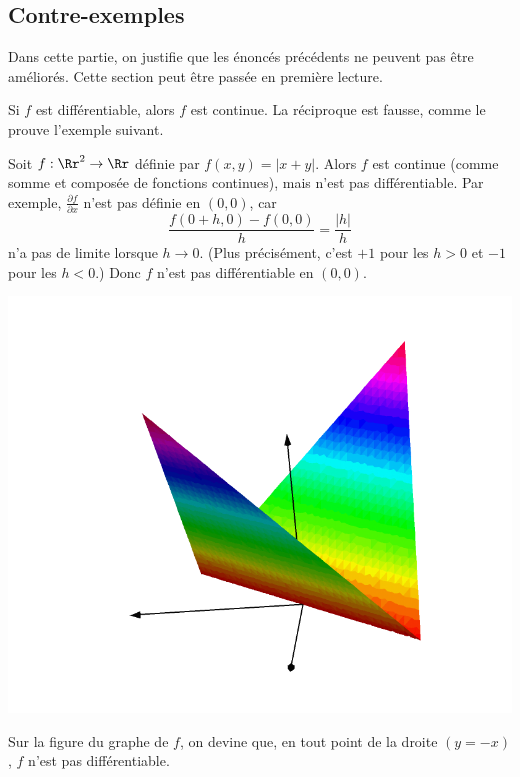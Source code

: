\documentclass[11pt, class=report,crop=false]{standalone}
\begin{document}
 

\subsection{Contre-exemples}


Dans cette partie, on justifie que les énoncés précédents ne peuvent pas être améliorés. Cette section peut être passée en première lecture.


\bigskip


Si $f$ est différentiable, alors $f$ est continue. La réciproque est fausse, comme le prouve l'exemple suivant.

\begin{exemple}
Soit $f : \Rr^2 \to \Rr$ définie par $f(x,y) = |x+y|$.
Alors $f$ est continue (comme somme et composée de fonctions continues), mais n'est pas différentiable. Par exemple, $\frac{\partial f}{\partial x}$ n'est pas définie en $(0,0)$, car 
$$\frac{f(0+h,0)-f(0,0)}{h} = \frac{|h|}{h}$$
n'a pas de limite lorsque $h \to 0$. (Plus précisément, c'est $+1$ pour les $h>0$ et $-1$ pour les $h<0$.) Donc $f$ n'est pas différentiable en $(0,0)$.


\begin{center}
  \includegraphics[scale=0.3]{figures/fig-calculdiff-03}
\end{center}


Sur la figure du graphe de $f$, on devine que, en tout point de la droite $(y=-x)$, $f$ n'est pas différentiable.
\end{exemple}
\end{document}
